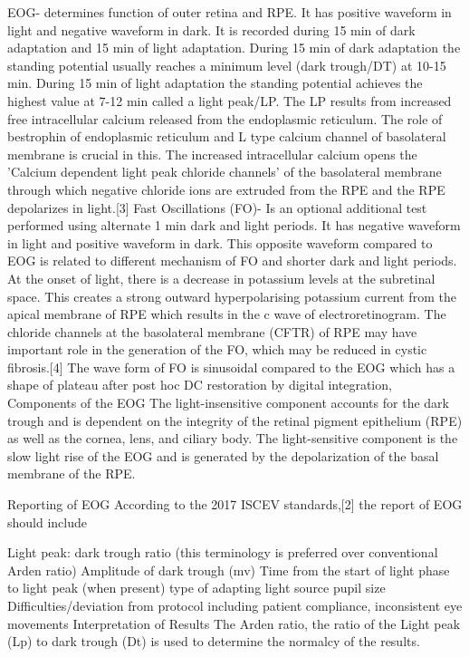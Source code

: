   EOG- determines function of outer retina and RPE. It has positive waveform in light and negative waveform in dark. It is recorded during 15 min of dark adaptation and 15 min of light adaptation. During 15 min of dark adaptation the standing potential usually reaches a minimum level (dark trough/DT) at 10-15 min. During 15 min of light adaptation the standing potential achieves the highest value at 7-12 min called a light peak/LP. The LP results from increased free intracellular calcium released from the endoplasmic reticulum. The role of bestrophin of endoplasmic reticulum and L type calcium channel of basolateral membrane is crucial in this. The increased intracellular calcium opens the 'Calcium dependent light peak chloride channels' of the basolateral membrane through which negative chloride ions are extruded from the RPE and the RPE depolarizes in light.[3]
  Fast Oscillations (FO)- Is an optional additional test performed using alternate 1 min dark and light periods. It has negative waveform in light and positive waveform in dark. This opposite waveform compared to EOG is related to different mechanism of FO and shorter dark and light periods. At the onset of light, there is a decrease in potassium levels at the subretinal space. This creates a strong outward hyperpolarising potassium current from the apical membrane of RPE which results in the c wave of electroretinogram. The chloride channels at the basolateral membrane (CFTR) of RPE may have important role in the generation of the FO, which may be reduced in cystic fibrosis.[4] The wave form of FO is sinusoidal compared to the EOG which has a shape of plateau after post hoc DC restoration by digital integration,
  Components of the EOG
  The light-insensitive component accounts for the dark trough and is dependent on the integrity of the retinal pigment epithelium (RPE) as well as the cornea, lens, and ciliary body. The light-sensitive component is the slow light rise of the EOG and is generated by the depolarization of the basal membrane of the RPE.
  
  Reporting of EOG
  According to the 2017 ISCEV standards,[2] the report of EOG should include
  
  Light peak: dark trough ratio (this terminology is preferred over conventional Arden ratio)
  Amplitude of dark trough (mv)
  Time from the start of light phase to light peak (when present)
  type of adapting light source
  pupil size
  Difficulties/deviation from protocol including patient compliance, inconsistent eye movements
  Interpretation of Results
  The Arden ratio, the ratio of the Light peak (Lp) to dark trough (Dt) is used to determine the normalcy of the results.
  
